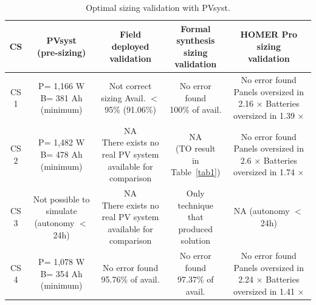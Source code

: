 \documentclass[10pt,journal,compsoc]{IEEEtran}
\begin{document}
\begin{table}
\centering
\caption{Optimal sizing validation with PVsyst.}
\label{tab2}
\begin{scriptsize}
\begin{tabular}{c|c|c|c|c}
\hline
\hline
CS & \makecell{PVsyst\\(pre-sizing)}& \makecell{Field\\deployed\\validation}& \makecell{Formal synthesis\\sizing\\validation}& \makecell{HOMER Pro\\sizing\\validation}\\
\hline
\hline
CS 1 & \makecell{P= 1,166 W\\B= 381 Ah\\(minimum)} & \makecell{Not correct sizing \\Avail. $<$ 95\%\\(91.06\%)} & \makecell{No error found \\100\% of avail.} & \makecell{No error found\\Panels oversized in 2.16 $\times$\\Batteries oversized in 1.39 $\times$}\\
\hline
CS 2 & \makecell{P= 1,482 W\\B= 478 Ah\\(minimum)} & \makecell{NA\\There exists no real PV system\\available for comparison} & \makecell{NA \\(TO result\\in Table~\ref{tab1})} & \makecell{No error found\\Panels oversized in 2.6 $\times$\\Batteries oversized in 1.74 $\times$}\\
\hline
CS 3 & \makecell{Not possible to \\simulate\\(autonomy $<$ 24h)} & \makecell{NA\\There exists no real PV system\\available for comparison} & \makecell{Only technique that\\produced solution} & \makecell{NA\\(autonomy $<$ 24h)}\\
\hline
CS 4 & \makecell{P= 1,078 W\\B= 354 Ah\\(minimum)} & \makecell{No error found \\95.76\% of avail.} & \makecell{No error found \\97.37\% of avail.} & \makecell{No error found\\Panels oversized in 2.24 $\times$\\Batteries oversized in 1.41 $\times$}\\

\end{tabular}
\end{scriptsize}
\end{table}
\end{document}
